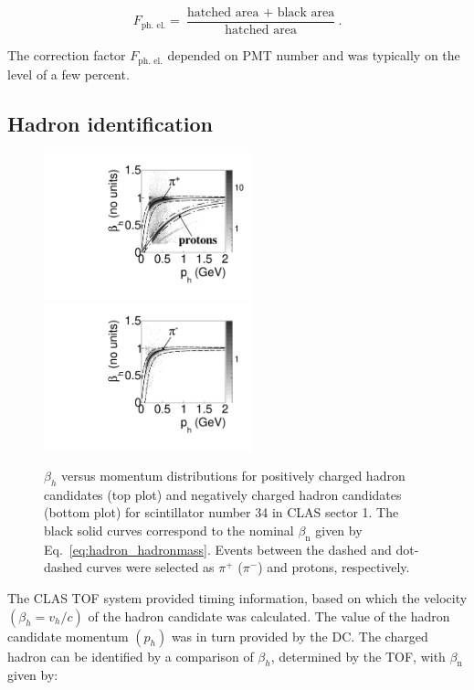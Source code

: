 \documentclass[prc,twocolumn,superscriptaddress,showpacs,amssymb,amsmath,amsfonts,aps,nofootinbib]{revtex4-1}
\begin{document}
\begin{equation}
F_{\text{ph. el.}} = \frac{\text{hatched area} {\,\,+\,\,} \text{black  area}}{\text{hatched area}} \textrm{.}
\label{eq:cc_corr_fact}
\end{equation}

The correction factor $F_{\text{ph. el.}}$ depended on PMT number and was typically on the level of a few percent.



\subsection{Hadron identification}

\begin{figure}[htp]
\begin{center}
 \includegraphics[width=6cm,keepaspectratio]{pictures/hadron_id/b_vs_p_positiv_time_corr.pdf}
\includegraphics[width=6cm,keepaspectratio]{pictures/hadron_id/b_vs_p_negative_time_corr.pdf} 
\vspace{-0.1cm}
\caption{$\beta_{h}$ versus momentum distributions for positively charged hadron candidates (top plot) and  negatively charged hadron candidates (bottom plot) for scintillator number 34 in CLAS sector 1. The black solid curves correspond to the nominal $\beta_{\text{n}}$ given by Eq.~\eqref{eq:hadron_hadronmass}. 
Events between the dashed and dot-dashed curves were selected as $\pi^{+}$ ($\pi^{-}$) and protons, respectively.}
\label{fig:b_vs_p}
\end{center}
\end{figure} 

The CLAS TOF system provided timing information, based on which  the velocity $(\beta_{h} = v_{h}/c)$ of the hadron candidate was calculated.  
The value of the hadron candidate momentum $(p_{h})$
was in turn provided by the DC.  The
charged hadron can be identified by a comparison of $\beta_{h}$, determined by the TOF, with $\beta_{\text{n}}$ given by:
\end{document}

